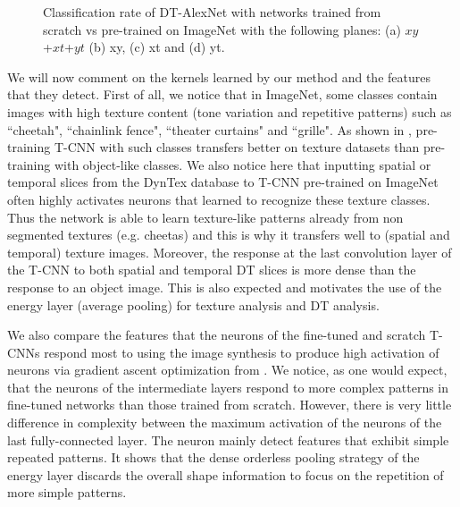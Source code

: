 \documentclass[a4paper,11pt]{article}
\begin{document}
\begin{figure*}[!t]
\centerline{
\hfil
{}
\hfil
{}
\hfil
{}}
\caption{Classification rate of DT-AlexNet with networks trained from scratch vs pre-trained on ImageNet with the following planes: (a) $xy$+$xt$+$yt$ (b) xy, (c) xt and (d) yt.}
\label{fig:chart_scratch}
\end{figure*}
We will now comment on the kernels learned by our method and the features that they detect.
First of all, we notice that in ImageNet, some classes contain images with high texture content (tone variation and repetitive patterns) such as ``cheetah", ``chainlink fence", ``theater curtains" and ``grille".
As shown in \cite{andrearczyk2016using}, pre-training  T-CNN with such classes transfers better on texture datasets than pre-training with object-like classes.
We also notice here that inputting spatial or temporal slices from the DynTex database to T-CNN pre-trained on ImageNet often highly activates neurons that learned to recognize these texture classes.
Thus the network is able to learn texture-like patterns already from non segmented textures (e.g. cheetas) and this is why it transfers well to (spatial and temporal) texture images.
Moreover, the response at the last convolution layer of the T-CNN to both spatial and temporal DT slices is more dense than the response to an object image.
This is also expected and motivates the use of the energy layer (average pooling) for texture analysis and DT analysis.

We also compare the features that the neurons of the fine-tuned and scratch T-CNNs respond most to using the image synthesis to produce high activation of neurons via gradient ascent optimization from \cite{yosinski2015understanding}.
We notice, as one would expect, that the neurons of the intermediate layers respond to more complex patterns in fine-tuned networks than those trained from scratch.
However, there is very little difference in complexity between the maximum activation of the neurons of the last fully-connected layer. The neuron mainly detect features that exhibit simple repeated patterns.
It shows that the dense orderless pooling strategy of the energy layer discards the overall shape information to focus on the repetition of more simple patterns.
\end{document}
